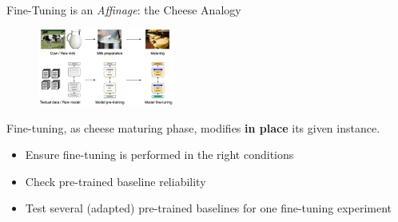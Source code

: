 \documentclass[11pt,aspectratio=169]{beamer}
\begin{document}
\begin{frame}{Fine-Tuning is an \textsl{Affinage}: the Cheese Analogy}
    \begin{figure}
        \centering
        \includegraphics[width=0.4\textwidth]{pretrain_finetune_2.png}
    \end{figure}
    Fine-tuning, as cheese maturing phase, modifies \textbf{in place} its given instance.
    \begin{itemize}
        \item Ensure fine-tuning is performed in the right conditions
        \item Check pre-trained baseline reliability
        \item Test several (adapted) pre-trained baselines for one fine-tuning experiment
    \end{itemize}
\end{frame}
\end{document}
